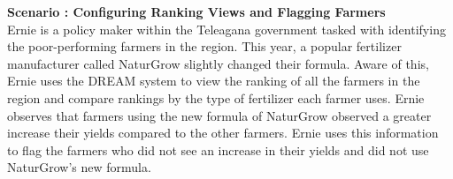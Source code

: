 \begin{flushleft}
\textbf{Scenario : Configuring Ranking Views and Flagging Farmers}\\\smallskip
Ernie is a policy maker within the Teleagana government tasked with identifying the poor-performing farmers in the region. This year, a popular fertilizer manufacturer called NaturGrow slightly changed their formula. Aware of this, Ernie uses the DREAM system to view the ranking of all the farmers in the region and compare rankings by the type of fertilizer each farmer uses. Ernie observes that farmers using the new formula of NaturGrow observed a greater increase their yields compared to the other farmers. Ernie uses this information to flag the farmers who did not see an increase in their yields and did not use NaturGrow's new formula. 
\end{flushleft}
